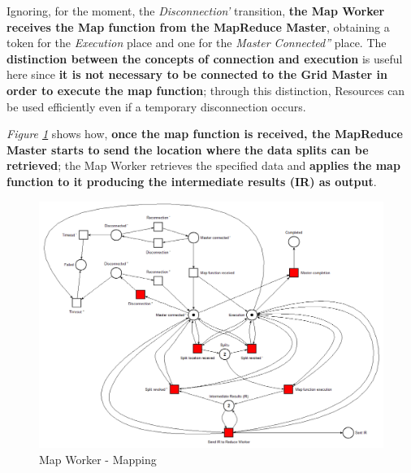 Ignoring, for the moment, the \textit{Disconnection'} transition, \textbf{the Map Worker receives the Map function from the MapReduce Master}, obtaining a token for the \textit{Execution} place and one for the \textit{Master Connected''} place. The \textbf{distinction between the concepts of connection and execution} is useful here since \textbf{it is not necessary to be connected to the Grid Master in order to execute the map function}; through this distinction, Resources can be used efficiently even if a temporary disconnection occurs.

\textit{Figure \ref{fig:map_worker_petri_net_2}} shows how, \textbf{once the map function is received, the MapReduce Master starts to send the location where the data splits can be retrieved}; the Map Worker retrieves the specified data and \textbf{applies the map function to it producing the intermediate results (IR) as output}.

\vspace{5mm}

\begin{figure}[!ht]
    \centering
    \includegraphics[width=\linewidth]{document/chapters/chapter_6/images/map_worker_petri_net_2.png}
    \caption{Map Worker - Mapping}
    \label{fig:map_worker_petri_net_2}
\end{figure}

